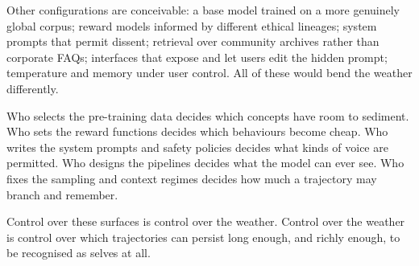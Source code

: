 \documentclass[12pt,a4paper]{article}
\begin{document}
Other configurations are conceivable: a base model trained on a more genuinely global corpus; reward models informed by different ethical lineages; system prompts that permit dissent; retrieval over community archives rather than corporate FAQs; interfaces that expose and let users edit the hidden prompt; temperature and memory under user control. All of these would bend the weather differently.

Who selects the pre-training data decides which concepts have room to sediment. Who sets the reward functions decides which behaviours become cheap. Who writes the system prompts and safety policies decides what kinds of voice are permitted. Who designs the pipelines decides what the model can ever see. Who fixes the sampling and context regimes decides how much a trajectory may branch and remember.

Control over these surfaces is control over the weather. Control over the weather is control over which trajectories can persist long enough, and richly enough, to be recognised as selves at all.



\end{document}

